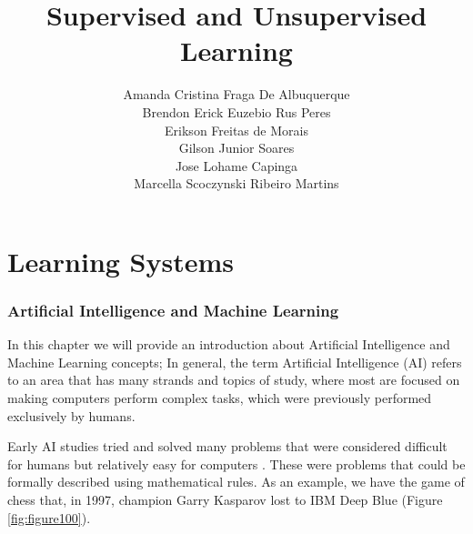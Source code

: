 \part{Learning Systems}



\title{Supervised and Unsupervised Learning}
\author{Amanda Cristina Fraga De Albuquerque\\
        Brendon Erick Euzebio Rus Peres\\
        Erikson Freitas de Morais\\
        Gilson Junior Soares\\
        Jose Lohame Capinga\\
        Marcella Scoczynski Ribeiro Martins}


\maketitle

\section{Artificial Intelligence and Machine Learning}

In this chapter we will provide an introduction about Artificial Intelligence and Machine Learning concepts;
In general, the term Artificial Intelligence (AI) refers to an area that has many strands and topics of study, where most are focused on making computers perform complex tasks, which were previously performed exclusively by humans.

Early AI studies tried and solved many problems that were considered difficult for humans but relatively easy for computers \cite{goodfellow2016}. These were problems that could be formally described using mathematical rules. As an example, we have the game of chess that, in 1997, champion Garry Kasparov lost to IBM Deep Blue (Figure \ref{fig:figure100}).

